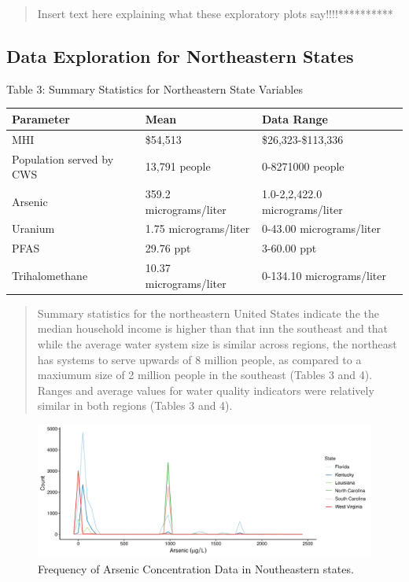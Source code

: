 \documentclass[12pt,]{article}
\begin{document}
\begin{quote}
Insert text here explaining what these exploratory plots
say!!!!**********
\end{quote}

\newpage

\hypertarget{data-exploration-for-northeastern-states}{%
\subsection{Data Exploration for Northeastern
States}\label{data-exploration-for-northeastern-states}}

Table 3: Summary Statistics for Northeastern State Variables

\begin{longtable}[]{@{}lll@{}}
\toprule
\textbf{Parameter} & \textbf{Mean} & \textbf{Data Range}\tabularnewline
\midrule
\endhead
MHI & \$54,513 & \$26,323-\$113,336\tabularnewline
Population served by CWS & 13,791 people & 0-8271000
people\tabularnewline
Arsenic & 359.2 micrograms/liter & 1.0-2,2,422.0
micrograms/liter\tabularnewline
Uranium & 1.75 micrograms/liter & 0-43.00
micrograms/liter\tabularnewline
PFAS & 29.76 ppt & 3-60.00 ppt\tabularnewline
Trihalomethane & 10.37 micrograms/liter & 0-134.10
micrograms/liter\tabularnewline
\bottomrule
\end{longtable}

\begin{quote}
Summary statistics for the northeastern United States indicate the the
median household income is higher than that inn the southeast and that
while the average water system size is similar across regions, the
northeast has systems to serve upwards of 8 million people, as compared
to a maxiumum size of 2 million people in the southeast (Tables 3 and
4). Ranges and average values for water quality indicators were
relatively similar in both regions (Tables 3 and 4).
\end{quote}

\begin{figure}
\centering
\includegraphics{Project_Template_files/figure-latex/figs3-1.pdf}
\caption{Frequency of Arsenic Concentration Data in Noutheastern
states.}
\end{figure}
\end{document}
